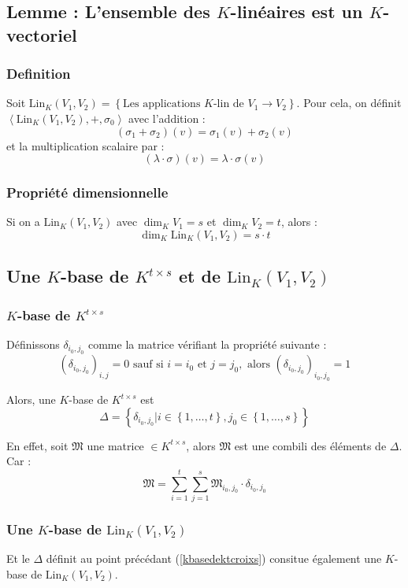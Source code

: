 \documentclass[a4paper,10pt]{article}
\newcommand{\ap}{ \rightarrow} %
\newcommand{\grp}[1]{\left\langle #1 \right\rangle} %
\newcommand{\set}[1]{\left\lbrace #1 \right\rbrace } %
\begin{document}
  \subsection{Lemme : L'ensemble des $K$-linéaires est un $K$-vectoriel}
   \subsubsection{Definition}
    Soit $\mathrm{Lin}_K (V_1,V_2) = \set{\mbox{Les applications } K \mbox{-lin de } V_1 \ap V_2}$.
    Pour cela, on définit $\grp{\mathrm{Lin}_K (V_1,V_2),+,\sigma_0}$ avec l'addition :
    $$(\sigma_1 + \sigma_2)(v)=\sigma_1(v)+\sigma_2(v)$$
    et la multiplication scalaire par :
    $$(\lambda \cdot \sigma)(v)=\lambda \cdot \sigma(v)$$

   \subsubsection{Propriété dimensionnelle}
    Si on a $\mathrm{Lin}_K (V_1,V_2)$ avec $\dim_K{V_1} = s$ et $\dim_K{V_2} = t$, alors :
     $$\dim_K{\mathrm{Lin}_K (V_1,V_2)} = s \cdot t$$

  \subsection{Une $K$-base de $K^{t \times s}$ et de $\mathrm{Lin}_K (V_1,V_2)$}
   \subsubsection{$K$-base de $K^{t \times s}$\label{kbasedektcroixs}}
    Définissons $\delta_{i_0, j_0}$ comme la matrice vérifiant la propriété suivante :
    $$\left( \delta_{i_0, j_0} \right)_{i,j} = 0 \mbox{ sauf si } i = i_0 \mbox{ et } j = j_0, \mbox{ alors } \left( \delta_{i_0, j_0} \right)_{i_0,j_0} = 1$$

    Alors, une $K$-base de $K^{t \times s}$ est
    $$\Delta = \set{\delta_{i_0, j_0} | i \in \set{1, \hdots, t} , j_0 \in \set{1, \hdots, s}}$$

    En effet, soit $\mathfrak{M}$ une matrice $\in K^{t \times s}$, alors $\mathfrak{M}$ est une combili des éléments de $\Delta$. Car :
    $$\mathfrak{M}= \sum^{t}_{i=1} \sum^{s}_{j=1} \mathfrak{M}_{i_0, j_0} \cdot \delta_{i_0,j_0}$$

   \subsubsection{Une $K$-base de $\mathrm{Lin}_K (V_1,V_2)$}
    Et le $\Delta$ définit au point précédant (\ref{kbasedektcroixs}) consitue également une $K$-base de $\mathrm{Lin}_K (V_1,V_2)$.
\end{document}
